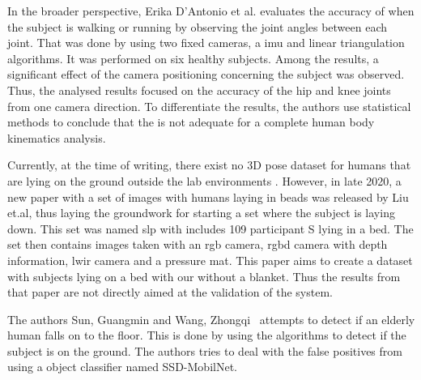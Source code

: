 
In the broader perspective, Erika D’Antonio et al. \cite{d2021validation} evaluates the accuracy of \openpose when the subject is walking or running by observing the joint angles between each joint.
That was done by using two fixed cameras, a \ac{imu} and linear triangulation algorithms. It was performed on six healthy subjects.
Among the results, a significant effect of the camera positioning concerning the subject was observed.
Thus, the analysed results focused on the accuracy of the hip and knee joints from one camera direction.
To differentiate the results, the authors use statistical methods to conclude that the \operpose is not adequate for a complete human body kinematics analysis.

Currently, at the time of writing, there exist no 3D pose dataset for humans that are lying on the ground outside the lab environments \cite{yang2018, mehta2017, yasin2016, wang2019}.
However, in late 2020, a new paper with a set of images with humans laying in beads was released by Liu et.al\cite{liu2020simultaneously}, thus laying the groundwork for starting a set where the subject is laying down.
This set was named \ac{slp} with includes 109 participant S lying in a bed.
The set then contains images taken with an \ac{rgb} camera, \ac{rgbd} camera with depth information, \ac{lwir} camera and a pressure mat.
This paper aims to create a dataset with subjects lying on a bed with our without a blanket.
Thus the results from that paper are not directly aimed at the validation of the system.

The authors Sun, Guangmin and Wang, Zhongqi~\cite{sun2020falldetect} attempts to detect if an elderly human falls on to the floor.
This is done by using the \opnepose algorithms to detect if the subject is on the ground.
The authors tries to deal with the false positives from \openpose using a object classifier named SSD-MobilNet.



